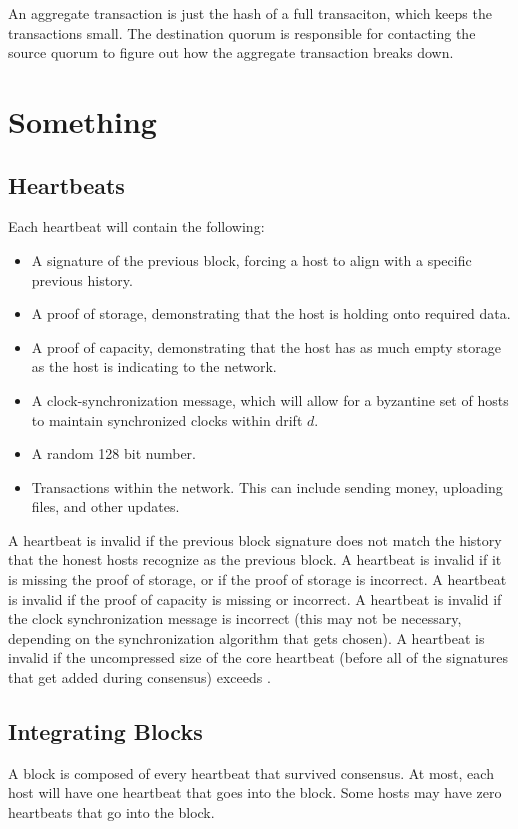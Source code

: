 \documentclass[twocolumn]{article}
\begin{document}
An aggregate transaction is just the hash of a full transaciton, which keeps the transactions small.
The destination quorum is responsible for contacting the source quorum to figure out how the aggregate transaction breaks down.

\section{Something}
\subsection{Heartbeats}
Each heartbeat will contain the following:
\begin{itemize}
	\item A signature of the previous block, forcing a host to align with a specific previous history.
	\item A proof of storage, demonstrating that the host is holding onto required data.
	\item A proof of capacity, demonstrating that the host has as much empty storage as the host is indicating to the network.
	\item A clock-synchronization message, which will allow for a byzantine set of hosts to maintain synchronized clocks within drift $d$.
	\item A random 128 bit number.
	\item Transactions within the network. This can include sending money, uploading files, and other updates.
\end{itemize}

A heartbeat is invalid if the previous block signature does not match the history that the honest hosts recognize as the previous block.
A heartbeat is invalid if it is missing the proof of storage, or if the proof of storage is incorrect.
A heartbeat is invalid if the proof of capacity is missing or incorrect.
A heartbeat is invalid if the clock synchronization message is incorrect (this may not be necessary, depending on the synchronization algorithm that gets chosen).
A heartbeat is invalid if the uncompressed size of the core heartbeat (before all of the signatures that get added during consensus) exceeds \hbsize{}.

\subsection{Integrating Blocks}
A block is composed of every heartbeat that survived consensus.
At most, each host will have one heartbeat that goes into the block.
Some hosts may have zero heartbeats that go into the block.
\end{document}
